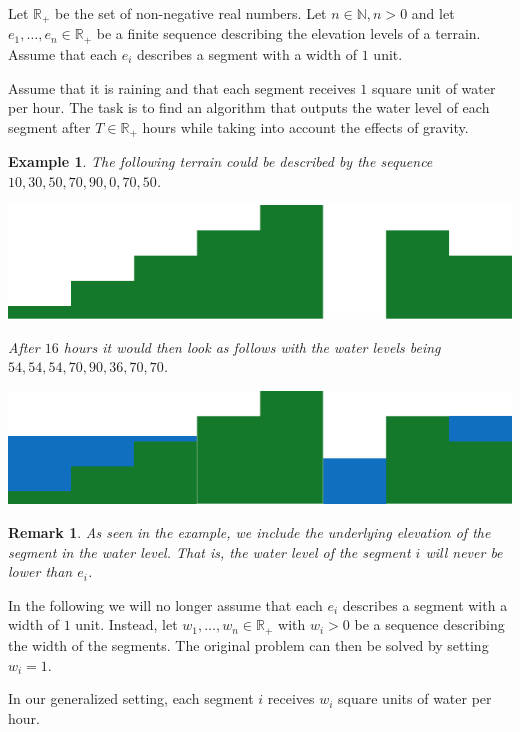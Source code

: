 \documentclass[11pt,a4paper]{article}
\newtheorem{rem}{Remark}
\newtheorem{ex}{Example}
\newcommand{\N}{\mathbb{N}}
\newcommand{\Rp}{\mathbb{R}_+}
\begin{document}
Let $\Rp$ be the set of non-negative real numbers.
Let $n\in\N, n > 0$ and let  $e_1, \ldots, e_n \in \Rp$ be a finite sequence describing the elevation levels of a terrain.
Assume that each $e_i$ describes a segment with a width of $1$ unit.

Assume that it is raining and that each segment receives $1$ square unit of water per hour.
The task is to find an algorithm that outputs the water level of each segment after $T\in\Rp$ hours while taking into account the effects of gravity.

\begin{ex}
  The following terrain could be described by the sequence $10, 30, 50, 70, 90, 0, 70, 50$.
  \begin{center}
    \includegraphics{im1.pdf}
  \end{center}
  After $16$ hours it would then look as follows with the water levels being $54, 54, 54, 70, 90, 36, 70, 70$.
  \begin{center}
    \includegraphics{im2.pdf}
  \end{center}
\end{ex}

\begin{rem}
    As seen in the example, we include the underlying elevation of the segment in the water level.
    That is, the water level of the segment $i$ will never be lower than $e_i$.
\end{rem}

In the following we will no longer assume that each $e_i$ describes a segment with a width of $1$ unit.
Instead, let $w_1,\ldots,w_n \in \Rp$ with $w_i > 0$ be a sequence describing the width of the segments.
The original problem can then be solved by setting $w_i = 1$.

In our generalized setting, each segment $i$ receives $w_i$ square units of water per hour.
\end{document}
